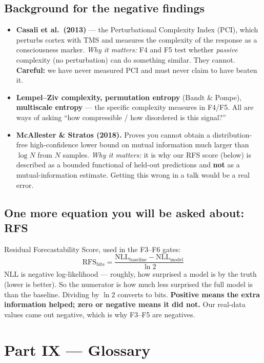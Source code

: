 \documentclass[11pt]{article}
\begin{document}
\subsection{Background for the negative findings}

\begin{itemize}
\item \textbf{Casali et al.\ (2013)} --- the Perturbational Complexity Index (PCI),
which perturbs cortex with TMS and measures the complexity of the response as a
consciousness marker. \emph{Why it matters:} F4 and F5 test whether \emph{passive}
complexity (no perturbation) can do something similar. They cannot.
\textbf{Careful:} we have never measured PCI and must never claim to have beaten
it.
\item \textbf{Lempel--Ziv complexity, permutation entropy} (Bandt \& Pompe),
\textbf{multiscale entropy} --- the specific complexity measures in F4/F5. All are
ways of asking ``how compressible / how disordered is this signal?''
\item \textbf{McAllester \& Stratos (2018).} Proves you cannot obtain a
distribution-free high-confidence lower bound on mutual information much larger
than $\log N$ from $N$ samples. \emph{Why it matters:} it is why our RFS score
(below) is described as a bounded functional of held-out predictions and
\textbf{not} as a mutual-information estimate. Getting this wrong in a talk would
be a real error.
\end{itemize}

\subsection{One more equation you will be asked about: RFS}

Residual Forecastability Score, used in the F3--F6 gates:
\begin{equation}
\mathrm{RFS}_{\text{bits}} = \frac{\mathrm{NLL}_{\text{baseline}} - \mathrm{NLL}_{\text{model}}}{\ln 2}
\end{equation}
NLL is negative log-likelihood --- roughly, how surprised a model is by the truth
(lower is better). So the numerator is how much less surprised the full model is
than the baseline. Dividing by $\ln 2$ converts to bits. \textbf{Positive means
the extra information helped; zero or negative means it did not.} Our real-data
values came out negative, which is why F3--F5 are negatives.

\section{Part IX --- Glossary}
\end{document}
